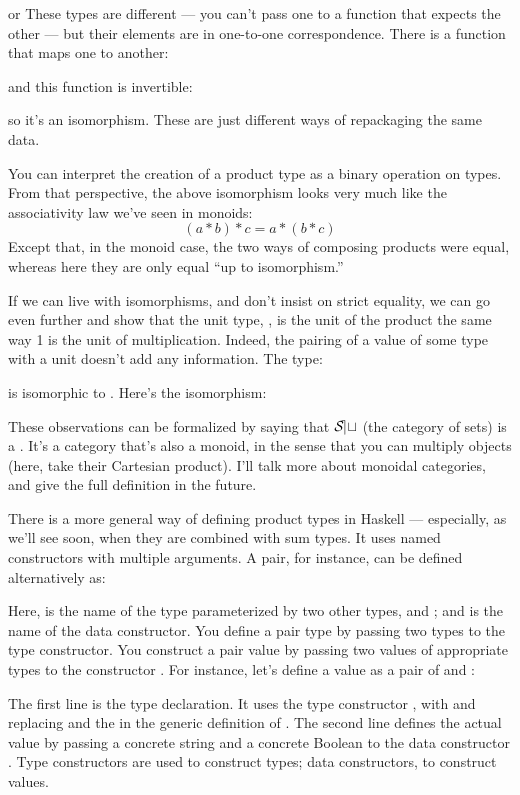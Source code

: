 
or
These types are different --- you can't pass one to a function that
expects the other --- but their elements are in one-to-one
correspondence. There is a function that maps one to another:

and this function is invertible:

so it's an isomorphism. These are just different ways of repackaging the
same data.

You can interpret the creation of a product type as a binary operation
on types. From that perspective, the above isomorphism looks very much
like the associativity law we've seen in monoids:
\[(a * b) * c = a * (b * c)\]
Except that, in the monoid case, the two ways of composing products were
equal, whereas here they are only equal ``up to isomorphism.''

If we can live with isomorphisms, and don't insist on strict equality,
we can go even further and show that the unit type, \code{()}, is the
unit of the product the same way 1 is the unit of multiplication.
Indeed, the pairing of a value of some type  with a unit
doesn't add any information. The type:

is isomorphic to . Here's the isomorphism:


These observations can be formalized by saying that $\mathcal{S\mkern-3mu et}$ (the
category of sets) is a . It's a category that's
also a monoid, in the sense that you can multiply objects (here, take
their Cartesian product). I'll talk more about monoidal categories, and
give the full definition in the future.

There is a more general way of defining product types in Haskell ---
especially, as we'll see soon, when they are combined with sum types. It
uses named constructors with multiple arguments. A pair, for instance,
can be defined alternatively as:

Here,  is the name of the type parameterized by two
other types,  and ; and  is the name of
the data constructor. You define a pair type by passing two types to the
 type constructor. You construct a pair value by passing
two values of appropriate types to the constructor . For
instance, let's define a value  as a pair of
 and :

The first line is the type declaration. It uses the type constructor
, with  and  replacing
 and the  in the generic definition of
. The second line defines the actual value by passing a
concrete string and a concrete Boolean to the data constructor
. Type constructors are used to construct types; data
constructors, to construct values.

